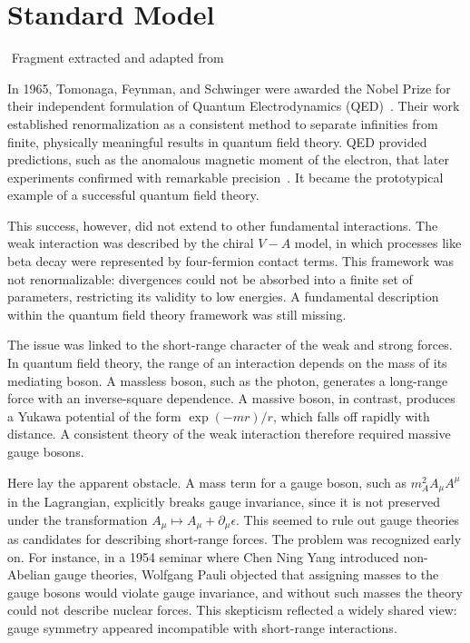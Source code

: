 \section{Standard Model}

{$ $ \scriptsize \hfill Fragment extracted and adapted from~\parencite{robinson2011symmetry}}

In 1965, Tomonaga, Feynman, and Schwinger were awarded the Nobel Prize for their independent formulation of Quantum Electrodynamics (QED)~\parencite{1972physics}. Their work established renormalization as a consistent method to separate infinities from finite, physically meaningful results in quantum field theory. QED provided predictions, such as the anomalous magnetic moment of the electron, that later experiments confirmed with remarkable precision~\parencite{1674-1137-40-10-100001, PhysRev.75.486}. It became the prototypical example of a successful quantum field theory.

This success, however, did not extend to other fundamental interactions. The weak interaction was described by the chiral $V-A$ model, in which processes like beta decay were represented by four-fermion contact terms. This framework was not renormalizable: divergences could not be absorbed into a finite set of parameters, restricting its validity to low energies. A fundamental description within the quantum field theory framework was still missing.

The issue was linked to the short-range character of the weak and strong forces. In quantum field theory, the range of an interaction depends on the mass of its mediating boson. A massless boson, such as the photon, generates a long-range force with an inverse-square dependence. A massive boson, in contrast, produces a Yukawa potential of the form $\exp(-mr)/r$, which falls off rapidly with distance. A consistent theory of the weak interaction therefore required massive gauge bosons.

Here lay the apparent obstacle. A mass term for a gauge boson, such as $m_{A}^{2} A_{\mu} A^{\mu}$ in the Lagrangian, explicitly breaks gauge invariance, since it is not preserved under the transformation $A_{\mu} \mapsto A_{\mu} + \partial_{\mu}\epsilon$. This seemed to rule out gauge theories as candidates for describing short-range forces. The problem was recognized early on. For instance, in a 1954 seminar where Chen Ning Yang introduced non-Abelian gauge theories, Wolfgang Pauli objected that assigning masses to the gauge bosons would violate gauge invariance, and without such masses the theory could not describe nuclear forces. This skepticism reflected a widely shared view: gauge symmetry appeared incompatible with short-range interactions.

